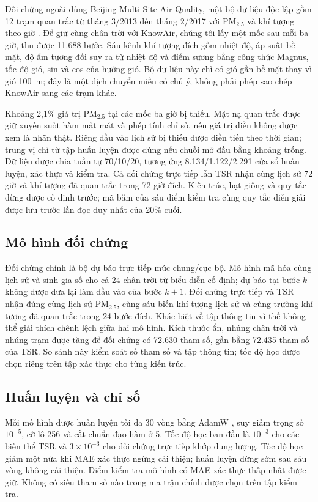 \documentclass[10pt,a4paper]{article}
\newcommand{\pmfine}{PM$_{2.5}$}
\newcommand{\modelname}{TSR}
\begin{document}
Đối chứng ngoài dùng Beijing Multi-Site Air Quality, một bộ dữ liệu độc lập gồm 12 trạm quan trắc từ tháng 3/2013 đến tháng 2/2017 với \pmfine{} và khí tượng theo giờ \citep{chen2017beijing}. Để giữ cùng chân trời với KnowAir, chúng tôi lấy một mốc sau mỗi ba giờ, thu được 11.688 bước. Sáu kênh khí tượng đích gồm nhiệt độ, áp suất bề mặt, độ ẩm tương đối suy ra từ nhiệt độ và điểm sương bằng công thức Magnus, tốc độ gió, sin và cos của hướng gió. Bộ dữ liệu này chỉ có gió gần bề mặt thay vì gió 100~m; đây là một dịch chuyển miền có chủ ý, không phải phép sao chép KnowAir sang các trạm khác.

Khoảng 2,1\% giá trị \pmfine{} tại các mốc ba giờ bị thiếu. Mặt nạ quan trắc được giữ xuyên suốt hàm mất mát và phép tính chỉ số, nên giá trị điền không được xem là nhãn thật. Riêng đầu vào lịch sử bị thiếu được điền tiến theo thời gian; trung vị chỉ từ tập huấn luyện được dùng nếu chuỗi mở đầu bằng khoảng trống. Dữ liệu được chia tuần tự 70/10/20, tương ứng 8.134/1.122/2.291 cửa sổ huấn luyện, xác thực và kiểm tra. Cả đối chứng trực tiếp lẫn \modelname{} nhận cùng lịch sử 72 giờ và khí tượng đã quan trắc trong 72 giờ đích. Kiến trúc, hạt giống và quy tắc dừng được cố định trước; mã băm của sáu điểm kiểm tra cùng quy tắc diễn giải được lưu trước lần đọc duy nhất của 20\% cuối.

\subsection{Mô hình đối chứng}

Đối chứng chính là bộ dự báo trực tiếp mức chung/cục bộ. Mô hình mã hóa cùng lịch sử và sinh gia số cho cả 24 chân trời từ biểu diễn cố định; dự báo tại bước $k$ không được đưa lại làm đầu vào của bước $k+1$. Đối chứng trực tiếp và \modelname{} nhận đúng cùng lịch sử \pmfine, cùng sáu biến khí tượng lịch sử và cùng trường khí tượng đã quan trắc trong 24 bước đích. Khác biệt về tập thông tin vì thế không thể giải thích chênh lệch giữa hai mô hình. Kích thước ẩn, nhúng chân trời và nhúng trạm được tăng để đối chứng có 72.630 tham số, gần bằng 72.435 tham số của \modelname. So sánh này kiểm soát số tham số và tập thông tin; tốc độ học được chọn riêng trên tập xác thực cho từng kiến trúc.

\subsection{Huấn luyện và chỉ số}

Mỗi mô hình được huấn luyện tối đa 30 vòng bằng AdamW \citep{loshchilov2019adamw}, suy giảm trọng số $10^{-5}$, cỡ lô 256 và cắt chuẩn đạo hàm ở 5. Tốc độ học ban đầu là $10^{-3}$ cho các biến thể \modelname{} và $3\times10^{-3}$ cho đối chứng trực tiếp khớp dung lượng. Tốc độ học giảm một nửa khi MAE xác thực ngừng cải thiện; huấn luyện dừng sớm sau sáu vòng không cải thiện. Điểm kiểm tra mô hình có MAE xác thực thấp nhất được giữ. Không có siêu tham số nào trong ma trận chính được chọn trên tập kiểm tra.
\end{document}
